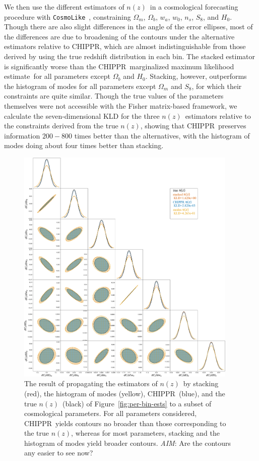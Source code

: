 \documentclass[iop]{emulateapj}
\newcommand{\todo}[3]{{\color{#2}\emph{#1}: #3}}
\newcommand{\aim}[1]{\todo{AIM}{red}{#1}}
\newcommand{\Fig}[1]{Figure~\ref{#1}}
\newcommand{\project}[1]{{\textsc{#1}}}
\newcommand{\Chippr}{\project{CHIPPR}}
\newcommand{\repo}[1]{{\texttt{#1}}~}
\newcommand{\cosmolike}{\repo{CosmoLike}}
\newcommand{\nz}{$n(z)$}
\newcommand{\mmle}{marginalized maximum likelihood estimate}
\begin{document}
We then use the different estimators of \nz\ in a cosmological forecasting procedure with \cosmolike, constraining $\Omega_{m}$, $\Omega_{b}$, $w_{a}$, $w_{0}$, $n_{s}$, $S_{8}$, and $H_{0}$.
Though there are also slight differences in the angle of the error ellipses, most of the differences are due to broadening of the contours under the alternative estimators relative to \Chippr, which are almost indistinguishable from those derived by using the true redshift distribution in each bin.
The stacked estimator is significantly worse than the \Chippr\ \mmle\ for all parameters except $\Omega_{b}$ and $H_{0}$.
Stacking, however, outperforms the histogram of modes for all parameters except $\Omega_{m}$ and $S_{8}$, for which their constraints are quite similar.
Though the true values of the parameters themselves were not accessible with the Fisher matrix-based framework, we calculate the seven-dimensional KLD for the three \nz\ estimators relative to the constraints derived from the true \nz, showing that \Chippr\ preserves information $200-800$ times better than the alternatives, with the histogram of modes doing about four times better than stacking.

\begin{figure}
	\begin{center}
		\includegraphics[width=0.94\textwidth]{figures/chippr/final_plot.png}
		\caption{
			The result of propagating the estimators of \nz\ by stacking (red), the histogram of modes (yellow), \Chippr\ (blue), and the true \nz\ (black) of \Fig{fig:per-bin-ests} to a subset of cosmological parameters.
			For all parameters considered, \Chippr\ yields contours no broader than those corresponding to the true \nz, whereas for most parameters, stacking and the histogram of modes yield broader contours.
			\aim{Are the contours any easier to see now?}
		}
		\label{fig:cornerplot}
	\end{center}
\end{figure}
\end{document}
